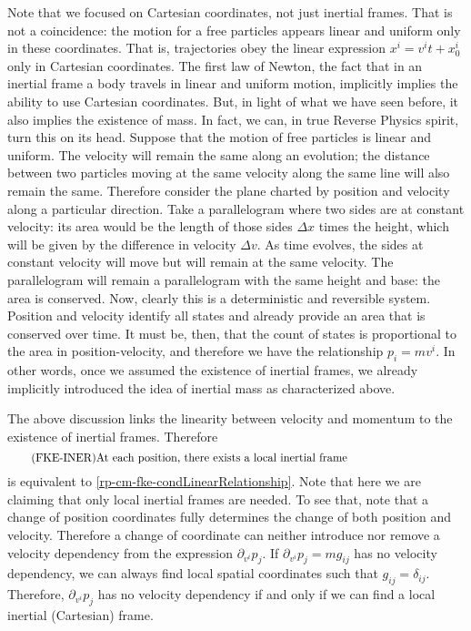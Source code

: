 Note that we focused on Cartesian coordinates, not just inertial frames. That is not a coincidence: the motion for a free particles appears linear and uniform only in these coordinates. That is, trajectories obey the linear expression $x^i = v^i t + x_0^i$ only in Cartesian coordinates. The first law of Newton, the fact that in an inertial frame a body travels in linear and uniform motion, implicitly implies the ability to use Cartesian coordinates. But, in light of what we have seen before, it also implies the existence of mass. In fact, we can, in true Reverse Physics spirit, turn this on its head. Suppose that the motion of free particles is linear and uniform. The velocity will remain the same along an evolution; the distance between two particles moving at the same velocity along the same line will also remain the same. Therefore consider the plane charted by  position and velocity along a particular direction. Take a parallelogram where two sides are at constant velocity: its area would be the length of those sides $\Delta x$ times the height, which will be given by the difference in velocity $\Delta v$. As time evolves, the sides at constant velocity will move but will remain at the same velocity. The parallelogram will remain a parallelogram with the same height and base: the area is conserved. Now, clearly this is a deterministic and reversible system. Position and velocity identify all states and already provide an area that is conserved over time. It must be, then, that the count of states is proportional to the area in position-velocity, and therefore we have the relationship $p_i=mv^i$. In other words, once we assumed the existence of inertial frames, we already implicitly introduced the idea of inertial mass as characterized above.

The above discussion links the linearity between velocity and momentum to the existence of inertial frames. Therefore
\begin{equation}
	\tag{FKE-INER}\label{rp-cm-fke-condInertial}
	\eqtext{At each position, there exists a local inertial frame}
\end{equation}
is equivalent to \ref{rp-cm-fke-condLinearRelationship}. Note that here we are claiming that only local inertial frames are needed. To see that, note that a change of position coordinates fully determines the change of both position and velocity. Therefore a change of coordinate can neither introduce nor remove a velocity dependency from the expression $\partial_{v^i} p_j$. If $\partial_{v^i} p_j = m g_{ij}$ has no velocity dependency, we can always find local spatial coordinates such that $g_{ij}=\delta_{ij}$. Therefore, $\partial_{v^i} p_j$ has no velocity dependency if and only if we can find a local inertial (Cartesian) frame.

